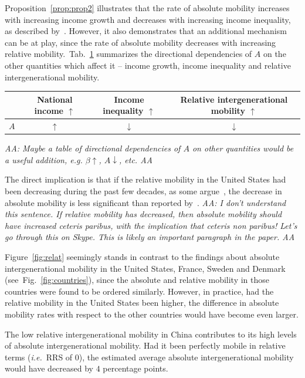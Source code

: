 \documentclass[12pt,a4paper]{article}
\newcommand{\ra}[1]{\renewcommand{\arraystretch}{#1}}
\newcommand{\red}[1]{{\color{red} #1}}
\newcommand{\Pref}[1]{Proposition~\ref{prop:#1}}
\newcommand{\ie}{{\it i.e.}\ }
\newcommand{\AAA}[1]{\red{{\it AA: #1 AA}}}
\newcommand{\fref}[1]{Fig.~\ref{fig:#1}}
\newcommand{\Fref}[1]{Figure~\ref{fig:#1}}
\newcommand{\tlabel}[1]{\label{tab:#1}}
\newcommand{\tref}[1]{Tab.~\ref{tab:#1}}
\numberwithin{equation}{section}
\begin{document}
\Pref{prop2} illustrates that the rate of absolute mobility increases with increasing income growth and decreases with increasing income inequality, as described by~\citet{chetty2017fading}. However, it also demonstrates that an additional mechanism can be at play, since the rate of absolute mobility decreases with increasing relative mobility.~\tref{directions} summarizes the directional dependencies of $A$ on the other quantities which affect it -- income growth, income inequality and relative intergenerational mobility.

\begin{table}[!htb]
\ra{1.1}
\centering
{}\tlabel{directions}
\begin{tabular}{@{}lccc@{}}\toprule[1.5pt]
  & National income $\uparrow$ & Income inequality $\uparrow$ & Relative intergenerational mobility $\uparrow$ \\
\midrule[1.5pt]
$A$ & $\uparrow$ & $\downarrow$ & $\downarrow$\\
\bottomrule[1.5pt]
\end{tabular}
\end{table}

\AAA{Maybe a table of directional dependencies of $A$ on other quantities would be a useful addition, e.g. $\beta\uparrow$, $A\downarrow$, etc.}

The direct implication is that if the relative mobility in the United States had been decreasing during the past few decades, as some argue~\citep{aaronson2008intergenerational,putnam2012growing}, the decrease in absolute mobility is less significant than reported by~\citet{chetty2017fading}. \AAA{I don't understand this sentence. If relative mobility has decreased, then absolute mobility should have increased ceteris paribus, with the implication that ceteris non paribus! Let's go through this on Skype. This is likely an important paragraph in the paper.}

\Fref{relat} seemingly stands in contrast to the findings about absolute intergenerational mobility in the United States, France, Sweden and Denmark (see~\fref{countries}), since the absolute and relative mobility in those countries were found to be ordered similarly. However, in practice, had the relative mobility in the United States been higher, the difference in absolute mobility rates with respect to the other countries would have become even larger.

The low relative intergenerational mobility in China contributes to its high levels of absolute intergenerational mobility. Had it been perfectly mobile in relative terms (\ie RRS of $0$), the estimated average absolute intergenerational mobility would have decreased by $4$ percentage points.
\end{document}
